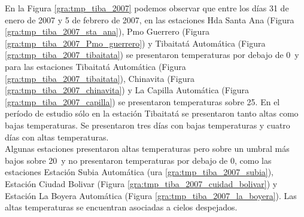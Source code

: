 En la Figura \ref{gra:tmp_tiba_2007} podemos observar que entre los días 31 de enero de 2007 y 5 de febrero de 2007, en las estaciones Hda Santa Ana (Figura \ref{gra:tmp_tiba_2007_sta_ana}), Pmo Guerrero (Figura \ref{gra:tmp_tiba_2007_Pmo_guerrero}) y Tibaitatá Automática (Figura \ref{gra:tmp_tiba_2007_tibaitata}) se presentaron temperaturas por debajo de 0\celc\ y para las estaciones Tibaitatá Automática (Figura \ref{gra:tmp_tiba_2007_tibaitata}), Chinavita (Figura \ref{gra:tmp_tiba_2007_chinavita}) y La Capilla Automática (Figura \ref{gra:tmp_tiba_2007_capilla}) se presentaron temperaturas sobre 25\celc. En el período de estudio sólo en la estación Tibaitatá se presentaron tanto altas como bajas temperaturas. Se presentaron tres días con bajas temperaturas y cuatro días con altas temperaturas.\\

Algunas estaciones presentaron altas temperaturas pero sobre un umbral más bajos sobre 20\celsius\, y no presentaron temperaturas por debajo de 0\celsius, como las estaciones Estación Subia Automática (ura \ref{gra:tmp_tiba_2007_subia}), Estación Ciudad Bolivar (Figura \ref{gra:tmp_tiba_2007_cuidad_bolivar}) y Estación La Boyera Automática (Figura \ref{gra:tmp_tiba_2007_la_boyera}). Las altas temperaturas se encuentran asociadas a cielos despejados.\\

